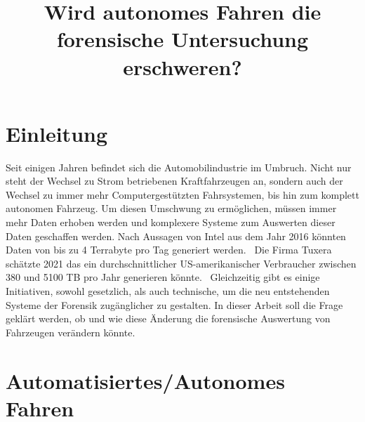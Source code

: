 \documentclass[conference,compsoc,final,a4paper]{IEEEtran}
\newcommand{\autoren}[0]{Gleumes, Folke Henning}
\newcommand{\dokumententitel}[0]{Wird autonomes Fahren die forensische Untersuchung erschweren?}
\begin{document}
\title{\dokumententitel}

\author{
  \IEEEauthorblockN{\autoren}
}

\maketitle
\thispagestyle{plain}
\pagestyle{plain}

\begin{abstract}
\end{abstract}

{\small\tableofcontents}

\section{Einleitung}

Seit einigen Jahren befindet sich die Automobilindustrie im Umbruch. Nicht nur steht der Wechsel zu Strom betriebenen Kraftfahrzeugen an,
sondern auch der Wechsel zu immer mehr Computergestützten Fahrsystemen, bis hin zum komplett autonomen Fahrzeug.
Um diesen Umschwung zu ermöglichen, müssen immer mehr Daten erhoben werden und komplexere Systeme zum Auswerten dieser Daten geschaffen werden.
Nach Aussagen von Intel aus dem Jahr 2016 könnten Daten von bis zu 4 Terrabyte pro Tag generiert werden.~\cite{Nelson2016}
Die Firma Tuxera schätzte 2021 das ein durchschnittlicher US-amerikanischer Verbraucher zwischen 380 und 5100 TB pro Jahr generieren könnte.~\cite{Wright2021}
Gleichzeitig gibt es einige Initiativen, sowohl gesetzlich\cite{Boehm2020}, als auch technische\cite{Hoque_2021a}\cite{Lee_2019}, um die neu entstehenden Systeme der Forensik zugänglicher zu gestalten.
In dieser Arbeit soll die Frage geklärt werden, ob und wie diese Änderung die forensische Auswertung von Fahrzeugen verändern könnte.

\section{Automatisiertes/Autonomes Fahren}

\end{document}
